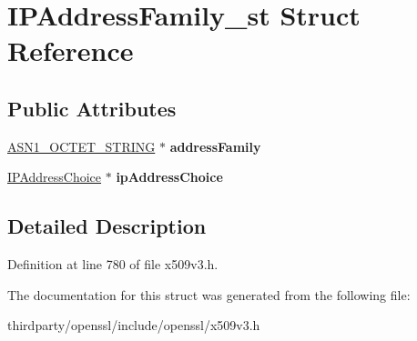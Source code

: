 \hypertarget{struct_i_p_address_family__st}{}\section{I\+P\+Address\+Family\+\_\+st Struct Reference}
\label{struct_i_p_address_family__st}
\subsection*{Public Attributes}
\begin{DoxyCompactItemize}
\item 
\mbox{\label{struct_i_p_address_family__st_ae57c9a03c3c674742caa8a3ddb51c72c}} 
\hyperlink{structasn1__string__st}{A\+S\+N1\+\_\+\+O\+C\+T\+E\+T\+\_\+\+S\+T\+R\+I\+NG} $\ast$ {\bfseries address\+Family}
\item 
\mbox{\label{struct_i_p_address_family__st_ab28cfcf9556e80a657083c93c2fd3eef}} 
\hyperlink{struct_i_p_address_choice__st}{I\+P\+Address\+Choice} $\ast$ {\bfseries ip\+Address\+Choice}
\end{DoxyCompactItemize}


\subsection{Detailed Description}


Definition at line 780 of file x509v3.\+h.



The documentation for this struct was generated from the following file\+:\begin{DoxyCompactItemize}
\item 
thirdparty/openssl/include/openssl/x509v3.\+h\end{DoxyCompactItemize}
